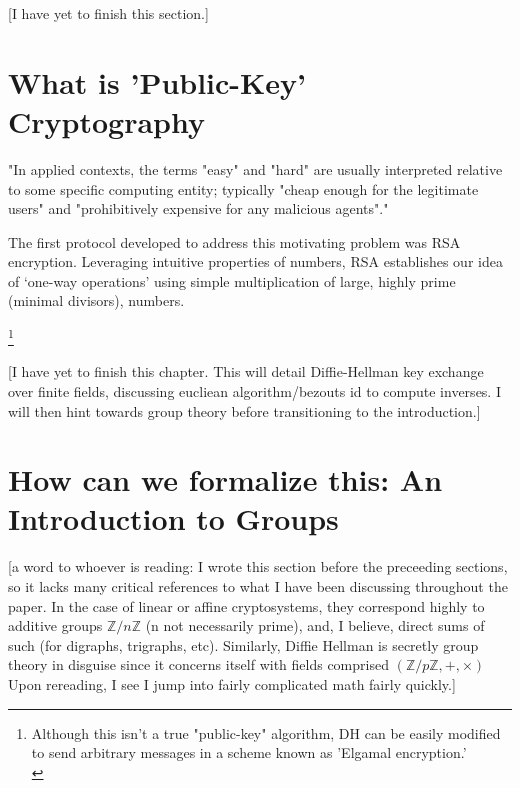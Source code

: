 \documentclass[11pt,a4paper]{article}
\newcommand{\integers}{\mathbb{Z}}
\begin{document}
[I have yet to finish this section.]

\section{What is 'Public-Key' Cryptography}
"In applied contexts, the terms "easy" and "hard" are usually interpreted relative to some specific computing entity; typically "cheap enough for the legitimate users" and "prohibitively expensive for any malicious agents"."

The first protocol developed to address this motivating problem was RSA encryption. Leveraging intuitive properties of numbers, RSA establishes our idea of ‘one-way operations’ using simple multiplication of large, highly prime (minimal divisors), numbers. 

\footnote{Although this isn't a true "public-key" algorithm, DH can be easily modified to send arbitrary messages in a scheme known as 'Elgamal encryption.'\\\autocite{elgamal}}

[I have yet to finish this chapter. This will detail Diffie-Hellman key exchange over finite fields, discussing eucliean algorithm/bezouts id to compute inverses. I will then hint towards group theory before transitioning to the introduction.]

\section{How can we formalize this: An Introduction to Groups}
[a word to whoever is reading: I wrote this section before the preceeding sections, so it lacks many critical references to what I have been discussing throughout the paper. In the case of linear or affine cryptosystems, they correspond highly to additive groups $\integers / n \integers$ (n not necessarily prime), and, I believe, direct sums of such (for digraphs, trigraphs, etc). Similarly, Diffie Hellman is secretly group theory in disguise since it concerns itself with fields comprised $(\integers / p \integers, +, \times)$ Upon rereading, I see I jump into fairly complicated math fairly quickly.]
\end{document}
